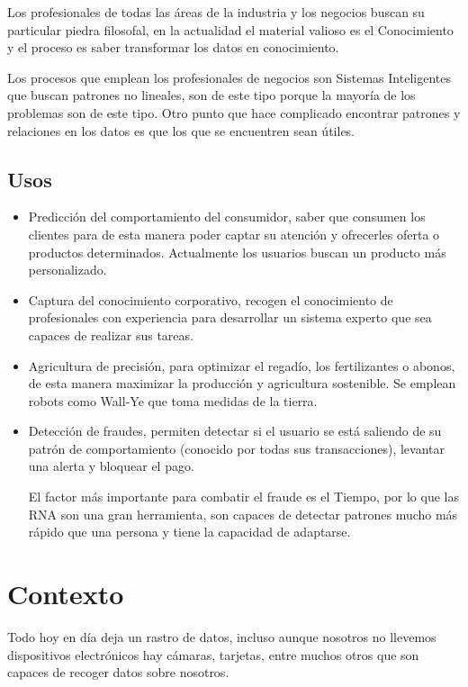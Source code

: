 \documentclass[12pt, twoside, openright]{report} %
\begin{document}
Los profesionales de todas las áreas de la industria y los negocios buscan su particular piedra filosofal, en la actualidad el material valioso es el Conocimiento y el proceso es saber transformar los datos en conocimiento.

Los procesos que emplean los profesionales de negocios son Sistemas Inteligentes que buscan patrones no lineales, son de este tipo porque la mayoría de los problemas son de este tipo. Otro punto que hace complicado encontrar patrones y relaciones en los datos es que los que se encuentren sean útiles.

\subsection{Usos}
\begin{itemize}
	\item Predicción del comportamiento del consumidor, saber que consumen los clientes para de esta manera poder captar su atención y ofrecerles oferta o productos determinados. Actualmente los usuarios buscan un producto más personalizado.
	\item Captura del conocimiento corporativo, recogen el conocimiento de profesionales con experiencia para desarrollar un sistema experto que sea capaces de realizar sus tareas.
	\item Agricultura de precisión, para optimizar el regadío, los fertilizantes o abonos, de esta manera maximizar la producción y agricultura sostenible. Se emplean robots como Wall-Ye que toma medidas de la tierra.
	\item Detección de fraudes, permiten detectar si el usuario se está saliendo de su patrón de comportamiento (conocido por todas sus transacciones), levantar una alerta y bloquear el pago.

	      El factor más importante para combatir el fraude es el Tiempo, por lo que las RNA son una gran herramienta, son capaces de detectar patrones mucho más rápido que una persona y tiene la capacidad de adaptarse.
\end{itemize}
\pagebreak

\section{Contexto}
Todo hoy en día deja un rastro de datos, incluso aunque nosotros no llevemos dispositivos electrónicos hay cámaras, tarjetas, entre muchos otros que son capaces de recoger datos sobre nosotros.
\end{document}
